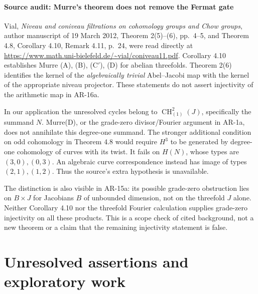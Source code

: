 \documentclass[11pt,a4paper]{article}
\begin{document}
\subsection*{Source audit: Murre's theorem does not remove the Fermat gate}

Vial, \emph{Niveau and coniveau filtrations on cohomology groups
and Chow groups}, author manuscript of 19 March 2012,
Theorem 2(5)--(6), pp.~4--5, and Theorem 4.8,
Corollary 4.10, Remark 4.11, p.~24, were read directly at
\url{https://www.math.uni-bielefeld.de/~vial/coniveau11.pdf}.
Corollary 4.10 establishes Murre (A), (B), (C$'$), (D) for abelian
threefolds. Theorem 2(6) identifies the kernel of the
\emph{algebraically trivial} Abel--Jacobi map with the kernel
of the appropriate niveau projector. These statements do not
assert injectivity of the arithmetic map in AR-16a.

In our application the unresolved cycles belong to
$\operatorname{CH}^2_{(1)}(J)$, specifically the summand $N$.
Murre(D), or the grade-zero divisor/Fourier argument in AR-1a,
does not annihilate this degree-one summand. The stronger
additional condition on odd cohomology in Theorem 4.8 would require
$H^3$ to be generated by degree-one cohomology of curves with its
twist. It fails on $H(N)$, whose types are $(3,0),(0,3)$.
An algebraic curve correspondence instead has image of types
$(2,1),(1,2)$. Thus the source's extra hypothesis is unavailable.

The distinction is also visible in AR-15a: its possible
grade-zero obstruction lies on $B\times J$ for Jacobians $B$
of unbounded dimension, not on the threefold $J$ alone.
Neither Corollary 4.10 nor the threefold Fourier calculation
supplies grade-zero injectivity on all these products.
This is a scope check of cited background, not a new theorem
or a claim that the remaining injectivity statement is false.
\part{Unresolved assertions and exploratory work}
\end{document}
